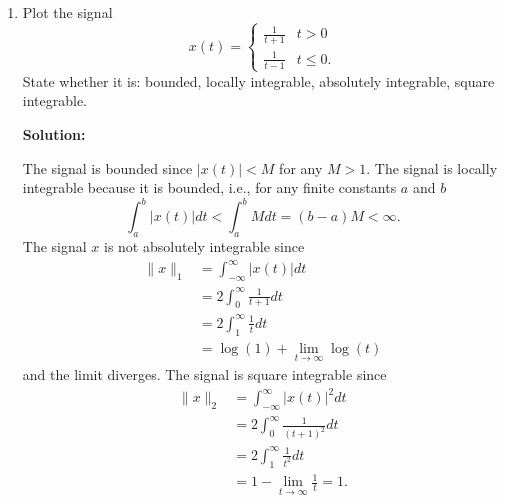 \documentclass[11pt,a4paper]{book}
\theoremstyle{plain}
\numberwithin{equation}{section}
\newcommand{\abs}[1]{\left\vert #1 \right\vert}
\newcommand{\sabs}[1]{\vert #1 \vert}
\newcommand{\vtick}[1]{\draw (#1,-0.075) -- (#1,0.075) }
\newcommand{\htick}[1]{\draw (-0.075,#1) -- (0.075,#1)}
\newenvironment{solution}{\begin{footnotesize}\textbf{Solution:}}{\end{footnotesize}}
\newenvironment{excersizelist}{%
  \renewcommand*{\theenumi}{\thechapter.\arabic{enumi}}%
  \newcommand\itemadvanced{\stepcounter{enumi}\item[$\ast$\, \theenumi.]}
  \begin{enumerate}
}{%
  \end{enumerate}
}
\begin{document}
\begin{excersizelist}
\item \label{exer:functionsquarenotabsint} Plot the signal 
\[
x(t) = \begin{cases}
\tfrac{1}{t+1} & t > 0 \\
\tfrac{1}{t-1} & t \leq 0.
\end{cases}
\]
State whether it is: bounded, locally integrable, absolutely integrable, square integrable.
\begin{solution}
\begin{center}
\end{center}
The signal is bounded since $\abs{x(t)} < M$ for any $M > 1$.  The signal is locally integrable because it is bounded, i.e., for any finite constants $a$ and $b$
\[
\int_{a}^b \abs{x(t)} dt < \int_{a}^b M dt = (b-a)M < \infty.
\]
The signal $x$ is not absolutely integrable since
\begin{align*}
\|x\|_1 &= \int_{-\infty}^\infty \abs{x(t)} dt \\
&= 2 \int_{0}^\infty \frac{1}{t+1} dt \\
&= 2 \int_{1}^\infty \frac{1}{t} dt \\
&= \log(1) + \lim_{t \to \infty} \log(t)
\end{align*}
and the limit diverges.  The signal is square integrable since
\begin{align*}
\|x\|_2 &= \int_{-\infty}^\infty \sabs{x(t)}^2 dt \\
&= 2 \int_{0}^\infty \frac{1}{(t+1)^2} dt \\
&= 2 \int_{1}^\infty \frac{1}{t^2} dt \\
&= 1 - \lim_{t \to \infty} \frac{1}{t} = 1.
\end{align*}
\end{solution}


\end{excersizelist}
\end{document}
